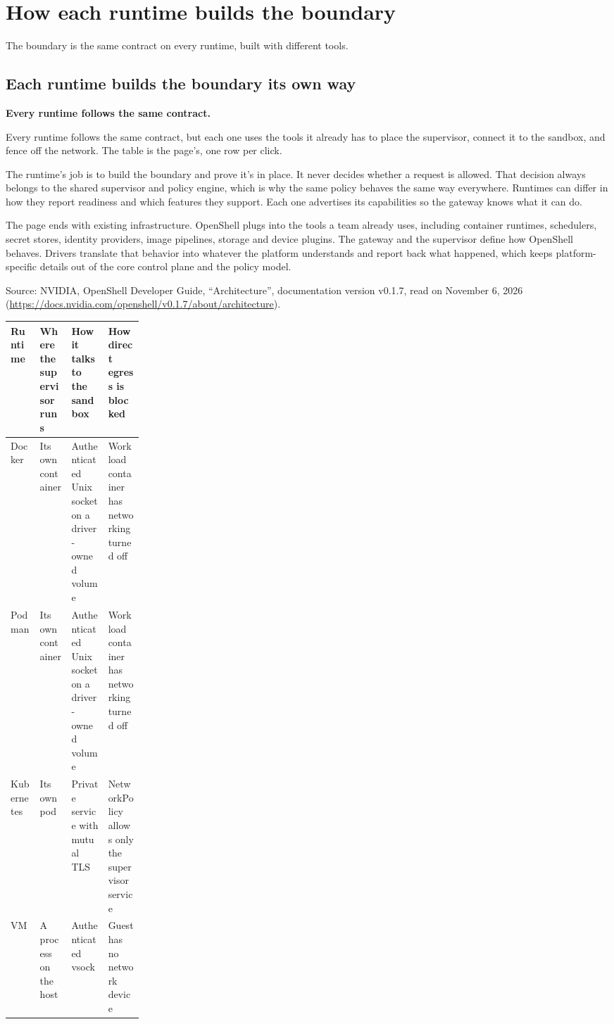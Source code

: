 \section{How each runtime builds the boundary}
\label{sec:row-p1-3}

The boundary is the same contract on every runtime, built with different tools.

\subsection{Each runtime builds the boundary its own way}
\label{sec:it-os-4-1}

\textbf{Every runtime follows the same contract.}

Every runtime follows the same contract, but each one uses the tools it already has to place the supervisor, connect it to the sandbox, and fence off the network. The table is the page's, one row per click.

The runtime's job is to build the boundary and prove it's in place. It never decides whether a request is allowed. That decision always belongs to the shared supervisor and policy engine, which is why the same policy behaves the same way everywhere. Runtimes can differ in how they report readiness and which features they support. Each one advertises its capabilities so the gateway knows what it can do.

The page ends with existing infrastructure. OpenShell plugs into the tools a team already uses, including container runtimes, schedulers, secret stores, identity providers, image pipelines, storage and device plugins. The gateway and the supervisor define how OpenShell behaves. Drivers translate that behavior into whatever the platform understands and report back what happened, which keeps platform-specific details out of the core control plane and the policy model.

Source: NVIDIA, OpenShell Developer Guide, ``Architecture'', documentation version v0.1.7, read on November 6, 2026 (\url{https://docs.nvidia.com/openshell/v0.1.7/about/architecture}).

\begin{center}\footnotesize
\begin{tabularx}{\linewidth}{L{0.22\linewidth}XXX}
\toprule
\textbf{Runtime} & \textbf{Where the supervisor runs} & \textbf{How it talks to the sandbox} & \textbf{How direct egress is blocked} \\
\midrule
Docker & Its own container & Authenticated Unix socket on a driver-owned volume & Workload container has networking turned off \\
Podman & Its own container & Authenticated Unix socket on a driver-owned volume & Workload container has networking turned off \\
Kubernetes & Its own pod & Private service with mutual TLS & NetworkPolicy allows only the supervisor service \\
VM & A process on the host & Authenticated vsock & Guest has no network device \\
\bottomrule
\end{tabularx}
\end{center}

